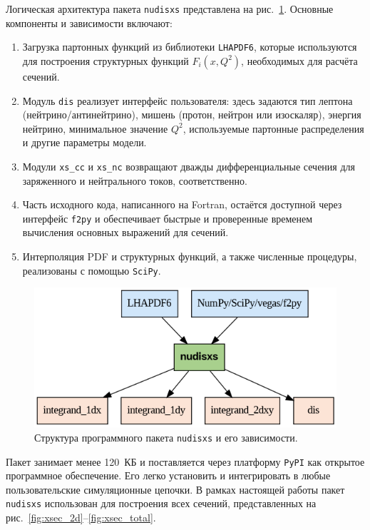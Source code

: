 Логическая архитектура пакета \texttt{nudisxs} представлена на рис.~\ref{fig:nudisxs1}. Основные компоненты и зависимости включают:

\begin{enumerate}
    \item Загрузка партонных функций из библиотеки \texttt{LHAPDF6}, которые используются для построения структурных функций $F_i(x, Q^2)$, необходимых для расчёта сечений.
    
    \item Модуль \texttt{dis} реализует интерфейс пользователя: здесь задаются тип лептона (нейтрино/антинейтрино), мишень (протон, нейтрон или изоскаляр), энергия нейтрино, минимальное значение $Q^2$, используемые партонные распределения и другие параметры модели.
    
    \item Модули \texttt{xs\_cc} и \texttt{xs\_nc} возвращают дважды дифференциальные сечения для заряженного и нейтрального токов, соответственно. 
    
    \item Часть исходного кода, написанного на Fortran, остаётся доступной через интерфейс \texttt{f2py} и обеспечивает быстрые и проверенные временем вычисления основных выражений для сечений.
    
    \item Интерполяция PDF и структурных функций, а также численные процедуры, реализованы с помощью \texttt{SciPy}.
\end{enumerate}

\begin{figure}[!h]
\centering
\includegraphics[width=\linewidth]{images/nudisxs_diagram.png}
\caption{Структура программного пакета \texttt{nudisxs} и его зависимости.}
\label{fig:nudisxs1}
\end{figure}

Пакет занимает менее 120~КБ и поставляется через платформу \texttt{PyPI} как открытое программное обеспечение. Его легко установить и интегрировать в любые пользовательские симуляционные цепочки. В рамках настоящей работы пакет \texttt{nudisxs} использован для построения всех сечений, представленных на рис.~\ref{fig:xsec_2d}–\ref{fig:xsec_total}.
